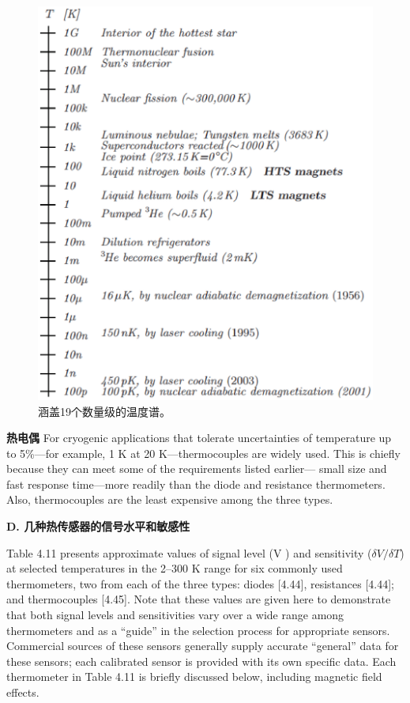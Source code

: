 \begin{figure}[htbp]
	\centering
	\includegraphics[scale=0.7]{chpt4/figs/fig4.19.eps}
	\caption{涵盖19个数量级的温度谱。}
\end{figure}

\textbf{热电偶} For cryogenic applications that tolerate uncertainties of temperature up to 5\%—for example, 1 K at 20 K—thermocouples are widely used.
This is chiefly because they can meet some of the requirements listed earlier—
small size and fast response time—more readily than the diode and resistance
thermometers. Also, thermocouples are the least expensive among the three types.

\textbf{D. 几种热传感器的信号水平和敏感性}

Table 4.11 presents approximate values of signal level (V ) and sensitivity ($\delta V/\delta T$)
at selected temperatures in the 2–300 K range for six commonly used thermometers, two from each of the three types: diodes [4.44], resistances [4.44]; and thermocouples [4.45]. Note that these values are given here to demonstrate that both
signal levels and sensitivities vary over a wide range among thermometers and as
a “guide” in the selection process for appropriate sensors. Commercial sources of
these sensors generally supply accurate “general” data for these sensors; each calibrated sensor is provided with its own specific data. Each thermometer in Table
4.11 is briefly discussed below, including magnetic field effects.

